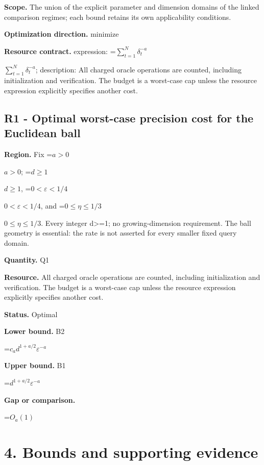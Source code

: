 \documentclass[10pt,a4paper]{article}
\newcommand{\AtlasMath}[1]{\par\begingroup\centering\setbox0=\hbox{$\displaystyle #1$}\ifdim\wd0>1.4\linewidth\typeout{ATLAS WIDE FORMULA: \the\wd0}\fi\ifdim\wd0>\linewidth\resizebox{\linewidth}{!}{\box0}\else\box0\fi\par\endgroup}
\newcommand{\AtlasInlineMath}[1]{\begingroup\setbox0=\hbox{$#1$}\ifdim\wd0>.4\linewidth\endgroup\AtlasMath{#1}\else\endgroup$#1$\fi}
\begin{document}
\textbf{Scope.} The union of the explicit parameter and dimension domains of the linked comparison regimes; each bound retains its own applicability conditions.



\textbf{Optimization direction.} minimize



\textbf{Resource contract.} expression: \AtlasInlineMath{\sum_{t=1}^N\delta_t^{-a}}; description: All charged oracle operations are counted, including initialization and verification. The budget is a worst-case cap unless the resource expression explicitly specifies another cost.



\subsection{R1 - Optimal worst-case precision cost for the Euclidean ball}


\textbf{Region.} Fix \AtlasInlineMath{a>0}; \AtlasInlineMath{d\ge1}, \AtlasInlineMath{0<\varepsilon<1/4}, and \AtlasInlineMath{0\le\eta\le1/3}. Every integer d>=1; no growing-dimension requirement. The ball geometry is essential: the rate is not asserted for every smaller fixed query domain.



\textbf{Quantity.} Q1



\textbf{Resource.} All charged oracle operations are counted, including initialization and verification. The budget is a worst-case cap unless the resource expression explicitly specifies another cost.



\textbf{Status.} Optimal



\textbf{Lower bound.} B2



\AtlasMath{c_a d^{1+a/2}\varepsilon^{-a}}


\textbf{Upper bound.} B1



\AtlasMath{d^{1+a/2}\varepsilon^{-a}}


\textbf{Gap or comparison.}



\AtlasMath{O_a(1)}


\section{4. Bounds and supporting evidence}
\end{document}

